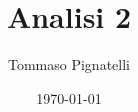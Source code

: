 



\title{Analisi 2}
\date{\today}
\author{Tommaso Pignatelli}

\frontmatter
\maketitle
\tableofcontents

\mainmatter



\backmatter


